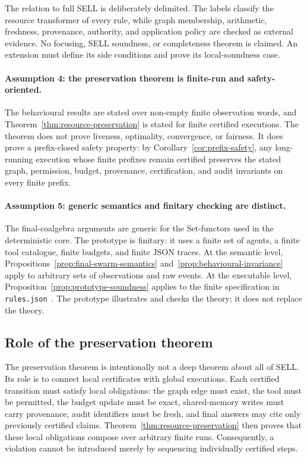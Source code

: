 \documentclass[a4paper,fleqn]{cas-sc}
\begin{document}
The relation to full SELL is deliberately delimited. The labels classify the
resource transformer of every rule, while graph membership, arithmetic,
freshness, provenance, authority, and application policy are checked as
external evidence. No focusing, SELL soundness, or completeness theorem is
claimed. An extension must define its side conditions and prove its
local-soundness case.

\paragraph{Assumption 4: the preservation theorem is finite-run and safety-oriented.}
The behavioural results are stated over non-empty finite observation words, and Theorem~\ref{thm:resource-preservation} is stated for finite certified executions. The theorem does not prove liveness, optimality, convergence, or fairness. It does prove a prefix-closed safety property: by Corollary~\ref{cor:prefix-safety}, any long-running execution whose finite prefixes remain certified preserves the stated graph, permission, budget, provenance, certification, and audit invariants on every finite prefix.

\paragraph{Assumption 5: generic semantics and finitary checking are distinct.}
The final-coalgebra arguments are generic for the Set-functors used in the deterministic core. The prototype is finitary: it uses a finite set of agents, a finite tool catalogue, finite budgets, and finite JSON traces. At the semantic level, Propositions~\ref{prop:final-swarm-semantics} and~\ref{prop:behavioural-invariance} apply to arbitrary sets of observations and raw events. At the executable level, Proposition~\ref{prop:prototype-soundness} applies to the finite specification in \texttt{rules.json}~\cite{artifact2026}. The prototype illustrates and checks the theory; it does not replace the theory.

\subsection{Role of the preservation theorem}

The preservation theorem is intentionally not a deep theorem about all of SELL. Its role is to connect local certificates with global executions. Each certified transition must satisfy local obligations: the graph edge must exist, the tool must be permitted, the budget update must be exact, shared-memory writes must carry provenance, audit identifiers must be fresh, and final answers may cite only previously certified claims. Theorem~\ref{thm:resource-preservation} then proves that these local obligations compose over arbitrary finite runs. Consequently, a violation cannot be introduced merely by sequencing individually certified steps.
\end{document}
